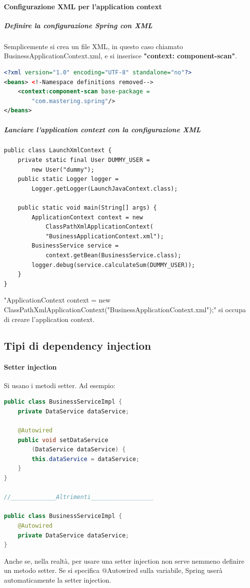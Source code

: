 \documentclass[11pt,a4paper]{book}
\begin{document}
\paragraph{Configurazione XML per l'application context}
\subparagraph{Definire la configurazione Spring con XML}
Semplicemente si crea un file XML, in questo caso chiamato BusinessApplicationContext.xml, e si inserisce \textbf{"context: component-scan"}.
\begin{lstlisting}[language = XML]
<?xml version="1.0" encoding="UTF-8" standalone="no"?>
<beans> <!-Namespace definitions removed-->
	<context:component-scan base-package =
		"com.mastering.spring"/>
</beans>
\end{lstlisting}
\subparagraph{Lanciare l'application context con la configurazione XML}
\begin{lstlisting}[language = XML]
public class LaunchXmlContext {
	private static final User DUMMY_USER = 
		new User("dummy");
	public static Logger logger =
		Logger.getLogger(LaunchJavaContext.class);
	
	public static void main(String[] args) {
		ApplicationContext context = new
			ClassPathXmlApplicationContext(
			"BusinessApplicationContext.xml");
		BusinessService service =
			context.getBean(BusinessService.class);
		logger.debug(service.calculateSum(DUMMY_USER));
	}
}
\end{lstlisting}
"ApplicationContext context = new ClassPathXmlApplicationContext("BusinessApplicationContext.xml");" si occupa di creare l'application context.

\subsection{Tipi di dependency injection}
\paragraph{Setter injection}
Si usano i metodi setter. Ad esempio:
\begin{lstlisting}[language = Java]
public class BusinessServiceImpl {
	private DataService dataService;
	
	@Autowired
	public void setDataService
		(DataService dataService) {
		this.dataService = dataService;
	}
}

//_____________Altrimenti__________________

public class BusinessServiceImpl {
	@Autowired
	private DataService dataService;
}
\end{lstlisting}
Anche se, nella realtà, per usare una setter injection non serve nemmeno definire un metodo setter. Se si specifica $@$Autowired sulla variabile, Spring userà automaticamente la setter injection.
\end{document}
